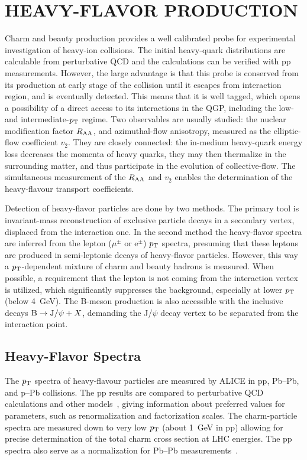 \section{HEAVY-FLAVOR PRODUCTION}
\label{heavyflavor}
Charm and beauty production provides a well calibrated probe for experimental investigation of heavy-ion collisions. The initial heavy-quark distributions are calculable from perturbative QCD and the calculations can be verified with pp measurements. However, the large advantage is that this probe is conserved from its production at early stage of the collision until it escapes from interaction region, and is eventually detected. This means that it is well tagged, which opens a possibility of a direct access to its interactions in the QGP, including the low- and intermediate-$p_{\rm T}$ regime. Two observables are usually studied: the nuclear modification factor $R_{\rm AA}$, and azimuthal-flow anisotropy, measured as the elliptic-flow coefficient $v_2$. They are closely connected: the in-medium heavy-quark energy loss decreases the momenta of heavy quarks, they may then thermalize in the surrounding matter, and thus participate in the evolution of collective-flow. The simultaneous measurement of the $R_{\rm AA}$ and $v_2$ enables the determination of the heavy-flavour transport coefficients.


Detection of heavy-flavor particles are done by two methods. The primary tool is invariant-mass reconstruction of exclusive particle decays in a secondary vertex, displaced from the interaction one. In the second method the heavy-flavor spectra are inferred from the lepton ($\mu^\pm$ or e$^\pm$) $p_{\rm T}$ spectra, presuming that these leptons are produced in semi-leptonic decays of heavy-flavor particles. However, this way a $p_{\rm T}$-dependent mixture of charm and beauty hadrons is measured. When possible, a requirement that the lepton is not coming from the interaction vertex is utilized, which significantly suppresses the background, especially at lower $p_{\rm T}$ (below 4~GeV). The B-meson production is also accessible with the inclusive decays ${\rm B} \rightarrow {\rm J}/\psi + X$, demanding the J/$\psi$ decay vertex to be separated from the interaction point.

\subsection{Heavy-Flavor Spectra}
\label{subsecks:heavyspectra}
The $p_{\rm T}$ spectra of heavy-flavour particles are measured by ALICE in pp, Pb--Pb, and p--Pb collisions. The pp results are compared to perturbative QCD calculations and other models~\cite{ALICE:2011aa,Abelev:2012vra}, giving information about preferred values for parameters, such as renormalization and factorization scales. The charm-particle spectra are measured down to very low $p_{\rm T}$ (about 1~GeV in pp) allowing for precise determination of the total charm cross section at LHC energies. The pp spectra also serve as a normalization for Pb--Pb measurements~\cite{ALICE:2012ab}.

